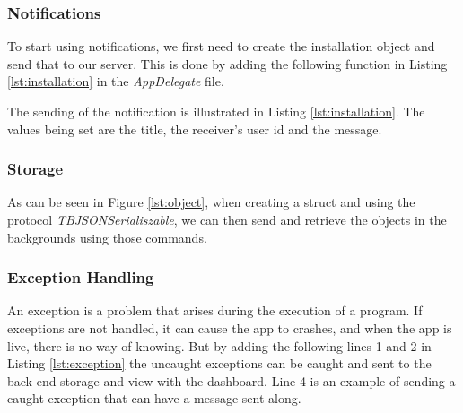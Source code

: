 

\subsubsection{Notifications}
To start using notifications, we first need to create the installation object and send that to our server. This is done by adding the following function in Listing \ref{lst:installation} in the \textit{AppDelegate} file.



The sending of the notification is illustrated in Listing \ref{lst:installation}. The values being set are the title, the receiver's user id and the message.



\subsubsection{Storage}



As can be seen in Figure \ref{lst:object}, when creating a struct and using the protocol \textit{TBJSONSerialiszable}, we can then send and retrieve the objects in the backgrounds using those commands.


\subsubsection{Exception Handling}

An exception is a problem that arises during the execution of a program. If exceptions are not handled, it can cause the app to crashes, and when the app is live, there is no way of knowing. But by adding the following lines 1 and 2 in Listing \ref{lst:exception} the uncaught exceptions can be caught and sent to the back-end storage and view with the dashboard. Line 4 is an example of sending a caught exception that can have a message sent along.

